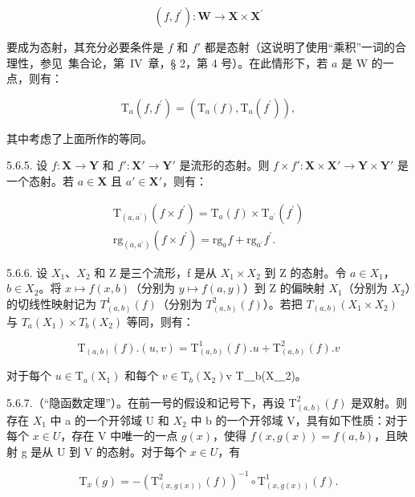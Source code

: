 \[
(f, f ^ {\prime}): \mathbf {W} \rightarrow \mathbf {X} \times \mathbf {X} ^ {\prime}
\]

要成为态射，其充分必要条件是 \(f\) 和 \(f'\) 都是态射（这说明了使用“乘积”一词的合理性，参见~集合论，第~IV~章，§ 2，第 4 号）。在此情形下，若 \(a\) 是 W 的一点，则有：

\[
\mathrm{T} _ {a} (f, f ^ {\prime}) = (\mathrm{T} _ {a} (f), \mathrm{T} _ {a} (f ^ {\prime})),
\]

其中考虑了上面所作的等同。

5.6.5. 设 \(f: \mathbf{X} \to \mathbf{Y}\) 和 \(f': \mathbf{X}' \to \mathbf{Y}'\) 是流形的态射。则 \(f \times f': \mathbf{X} \times \mathbf{X}' \to \mathbf{Y} \times \mathbf{Y}'\) 是一个态射。若 \(a \in \mathbf{X}\) 且 \(a' \in \mathbf{X}'\)，则有：

\[
\begin{array}{l} \mathrm{T} _ {(a, a ^ {\prime})} (f \times f ^ {\prime}) = \mathrm{T} _ {a} (f) \times \mathrm{T} _ {a ^ {\prime}} (f ^ {\prime}) \\ \mathrm{rg} _ {(a, a ^ {\prime})} (f \times f ^ {\prime}) = \mathrm{rg} _ {a} f + \mathrm{rg} _ {a ^ {\prime}} f ^ {\prime}. \end{array}
\]

5.6.6. 设 \(X_{1}\)、\(X_{2}\) 和 Z 是三个流形，f 是从 \(X_{1} \times X_{2}\) 到 Z 的态射。令 \(a \in X_{1}\)，\(b \in X_{2}\)。将 \(x \mapsto f(x, b)\)（分别为 \(y \mapsto f(a, y)\)）到 Z 的偏映射 \(X_{1}\)（分别为 \(X_{2}\)）的切线性映射记为 \(T_{(a,b)}^{1}(f)\)（分别为 \(T_{(a,b)}^{2}(f)\)）。若把 \(T_{(a,b)}(X_{1} \times X_{2})\) 与 \(T_{a}(X_{1}) \times T_{b}(X_{2})\) 等同，则有：

\[
\mathrm{T} _ {(a, b)} (f). (u, v) = \mathrm{T} _ {(a, b)} ^ {1} (f). u + \mathrm{T} _ {(a, b)} ^ {2} (f). v
\]

对于每个 \(u \in \mathrm{T}_a(\mathrm{X}_1)\) 和每个 \(v \in \mathrm{T}_b(\mathrm{X}_2)\)v  T＿b(X＿2)。

5.6.7.（“隐函数定理”）。在前一号的假设和记号下，再设 \(\mathrm{T}_{(a,b)}^{2}(f)\) 是双射。则存在 \(X_{1}\) 中 a 的一个开邻域 U 和 \(X_{2}\) 中 b 的一个开邻域 V，具有如下性质：对于每个 \(x \in U\)，存在 V 中唯一的一点 \(g(x)\)，使得 \(f(x, g(x)) = f(a, b)\)，且映射 g 是从 U 到 V 的态射。对于每个 \(x \in U\)，有

\[
\mathrm{T} _ {x} (g) = - \left(\mathrm{T} _ {(x, g (x))} ^ {2} (f)\right) ^ {- 1} \circ \mathrm{T} _ {(x, g (x))} ^ {1} (f).
\]

